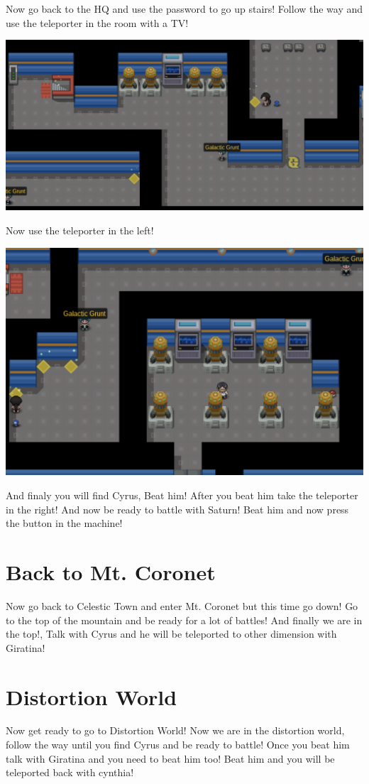 \documentclass[11pt]{article}
\begin{document}
Now go back to the HQ and use the password to go up stairs!
Follow the way and use the teleporter in the room with a TV!

\includegraphics[width=\textwidth]{walkthrough/Sinnoh/galactic-3}

Now use the teleporter in the left!

\includegraphics[width=\textwidth]{walkthrough/Sinnoh/galactic-4}

And finaly you will find Cyrus, Beat him!
After you beat him take the teleporter in the right!
And now be ready to battle with Saturn!
Beat him and now press the button in the machine!

\section{Back to Mt. Coronet}
Now go back to Celestic Town and enter Mt. Coronet but this time go down!
Go to the top of the mountain and be ready for a lot of battles!
And finally we are in the top!, Talk with Cyrus and he will be
teleported to other dimension with Giratina!

\section{Distortion World}
Now get ready to go to Distortion World!
Now we are in the distortion world, 
follow the way until you find Cyrus and be ready to battle!
Once you beat him talk with Giratina and you need to beat him too!
Beat him and you will be teleported back with cynthia!
\end{document}
